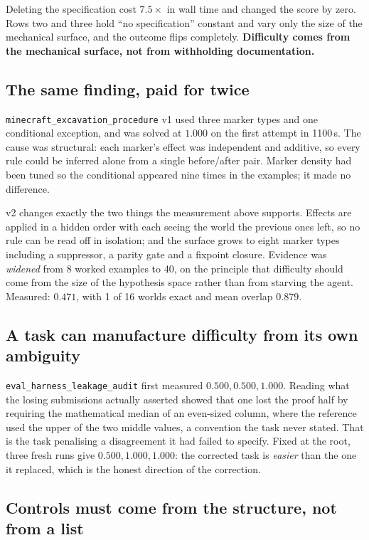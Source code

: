 \documentclass[11pt,a4paper]{article}
\newcommand{\task}[1]{\texttt{#1}}
\begin{document}
Deleting the specification cost $7.5\times$ in wall time and changed the score by
zero. Rows two and three hold ``no specification'' constant and vary only the size
of the mechanical surface, and the outcome flips completely. \textbf{Difficulty
comes from the mechanical surface, not from withholding documentation.}

\subsection{The same finding, paid for twice}

\task{minecraft\_excavation\_procedure} v1 used three marker types and one
conditional exception, and was solved at $1.000$ on the first attempt in 1100\,s.
The cause was structural: each marker's effect was independent and additive, so
every rule could be inferred alone from a single before/after pair. Marker density
had been tuned so the conditional appeared nine times in the examples; it made no
difference.

v2 changes exactly the two things the measurement above supports. Effects are
applied in a hidden order with each seeing the world the previous ones left, so no
rule can be read off in isolation; and the surface grows to eight marker types
including a suppressor, a parity gate and a fixpoint closure. Evidence was
\emph{widened} from 8 worked examples to 40, on the principle that difficulty should
come from the size of the hypothesis space rather than from starving the agent.
Measured: $0.471$, with 1 of 16 worlds exact and mean overlap $0.879$.

\subsection{A task can manufacture difficulty from its own ambiguity}

\task{eval\_harness\_leakage\_audit} first measured $0.500, 0.500, 1.000$. Reading
what the losing submissions actually asserted showed that one lost the proof half by
requiring the mathematical median of an even-sized column, where the reference used
the upper of the two middle values, a convention the task never stated. That is the
task penalising a disagreement it had failed to specify. Fixed at the root, three
fresh runs give $0.500, 1.000, 1.000$: the corrected task is \emph{easier} than the
one it replaced, which is the honest direction of the correction.

\subsection{Controls must come from the structure, not from a list}
\end{document}
